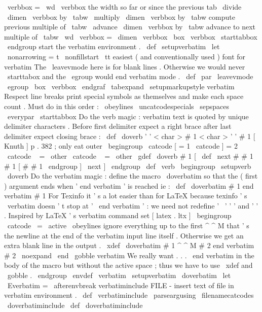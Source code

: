 {{{{{{\
verbbox
=
\
wd
\
verbbox
%
the
width
so
far
or
since
the
previous
tab
\
divide
\
dimen
\
verbbox
by
\
tabw
\
multiply
\
dimen
\
verbbox
by
\
tabw
%
compute
previous
multiple
of
\
tabw
\
advance
\
dimen
\
verbbox
by
\
tabw
%
advance
to
next
multiple
of
\
tabw
\
wd
\
verbbox
=
\
dimen
\
verbbox
\
box
\
verbbox
\
starttabbox
}
%
}
\
endgroup
%
start
the
verbatim
environment
.
\
def
\
setupverbatim
{
%
\
let
\
nonarrowing
=
t
%
\
nonfillstart
\
tt
%
easiest
(
and
conventionally
used
)
font
for
verbatim
%
The
\
leavevmode
here
is
for
blank
lines
.
Otherwise
we
would
%
never
\
starttabox
and
the
\
egroup
would
end
verbatim
mode
.
\
def
\
par
{
\
leavevmode
\
egroup
\
box
\
verbbox
\
endgraf
}
%
\
tabexpand
\
setupmarkupstyle
{
verbatim
}
%
%
Respect
line
breaks
%
print
special
symbols
as
themselves
and
%
make
each
space
count
.
%
Must
do
in
this
order
:
\
obeylines
\
uncatcodespecials
\
sepspaces
\
everypar
{
\
starttabbox
}
%
}
%
Do
the
verb
magic
:
verbatim
text
is
quoted
by
unique
%
delimiter
characters
.
Before
first
delimiter
expect
a
%
right
brace
after
last
delimiter
expect
closing
brace
:
%
%
\
def
\
doverb
'
{
'
<
char
>
#
1
<
char
>
'
}
'
{
#
1
}
%
%
[
Knuth
]
p
.
382
;
only
eat
outer
{
}
\
begingroup
\
catcode
[
=
1
\
catcode
]
=
2
\
catcode
\
{
=
\
other
\
catcode
\
}
=
\
other
\
gdef
\
doverb
{
#
1
[
\
def
\
next
#
#
1
#
1
}
[
#
#
1
\
endgroup
]
\
next
]
\
endgroup
%
\
def
\
verb
{
\
begingroup
\
setupverb
\
doverb
}
%
%
%
Do
the
verbatim
magic
:
define
the
macro
\
doverbatim
so
that
%
the
(
first
)
argument
ends
when
'
end
verbatim
'
is
reached
ie
:
%
%
\
def
\
doverbatim
#
1
end
verbatim
{
#
1
}
%
%
For
Texinfo
it
'
s
a
lot
easier
than
for
LaTeX
%
because
texinfo
'
s
\
verbatim
doesn
'
t
stop
at
'
\
end
{
verbatim
}
'
:
%
we
need
not
redefine
'
\
'
'
{
'
and
'
}
'
.
%
%
Inspired
by
LaTeX
'
s
verbatim
command
set
[
latex
.
ltx
]
%
\
begingroup
\
catcode
\
=
\
active
\
obeylines
%
%
ignore
everything
up
to
the
first
^
^
M
that
'
s
the
newline
at
the
end
%
of
the
verbatim
input
line
itself
.
Otherwise
we
get
an
extra
blank
%
line
in
the
output
.
\
xdef
\
doverbatim
#
1
^
^
M
#
2
end
verbatim
{
#
2
\
noexpand
\
end
\
gobble
verbatim
}
%
%
We
really
want
{
.
.
.
\
end
verbatim
}
in
the
body
of
the
macro
but
%
without
the
active
space
;
thus
we
have
to
use
\
xdef
and
\
gobble
.
\
endgroup
%
\
envdef
\
verbatim
{
%
\
setupverbatim
\
doverbatim
}
\
let
\
Everbatim
=
\
afterenvbreak
%
verbatiminclude
FILE
-
insert
text
of
file
in
verbatim
environment
.
%
\
def
\
verbatiminclude
{
\
parseargusing
\
filenamecatcodes
\
doverbatiminclude
}
%
\
def
\
doverbatiminclude
}}}}
